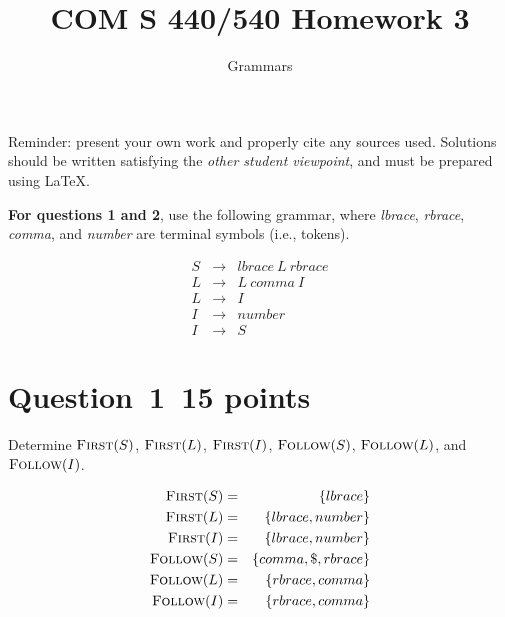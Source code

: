 \documentclass[10pt]{article}
\title{COM S 440/540 Homework 3}
\date{}
\author{Grammars}
\begin{document}
\maketitle

\noindent
Reminder: present your own work and properly cite any sources used.
Solutions should be written satisfying the \emph{other student viewpoint},
and must be prepared using \LaTeX.
\renewcommand{\thepage}{~}
 
\noindent 
{\bf For questions 1 and 2}, use the following grammar, where
\emph{lbrace}, \emph{rbrace}, \emph{comma}, and \emph{number}
are terminal symbols (i.e., tokens).

\begin{eqnarray}
  S & \rightarrow & \mathit{lbrace} ~L~ \mathit{rbrace}
\\
  L & \rightarrow & L ~\mathit{comma}~ I
\\
  L & \rightarrow & I
\\
  I & \rightarrow & \mathit{number}
\\
  I & \rightarrow & S
\end{eqnarray}


\section*{Question~1~\hfill 15 points}

Determine
  $\textsc{First}(S)$,
  $\textsc{First}(L)$,
  $\textsc{First}(I)$,
  $\textsc{Follow}(S)$,
  $\textsc{Follow}(L)$, and
  $\textsc{Follow}(I)$.
\begin{framed}
\begin{eqnarray*}
    \textsc{First}(S) & = & \{lbrace\} \\
    \textsc{First}(L) & = & \{lbrace, number \} \\
    \textsc{First}(I) & = & \{lbrace, number \} \\
    \textsc{Follow}(S) & = & \{comma, \$, rbrace\} \\
    \textsc{Follow}(L) & = & \{rbrace, comma\} \\
    \textsc{Follow}(I) & = & \{rbrace, comma\}
\end{eqnarray*}
\end{framed}
\end{document}
